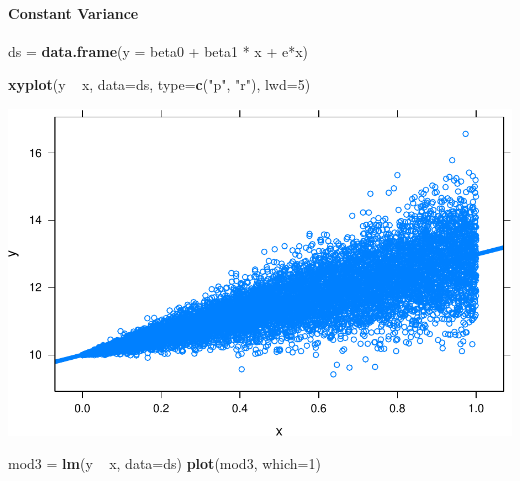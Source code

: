 \documentclass[]{article}
\newenvironment{Shaded}{\begin{snugshade}}{\end{snugshade}}
\newcommand{\KeywordTok}[1]{\textcolor[rgb]{0.13,0.29,0.53}{\textbf{{#1}}}}
\newcommand{\DataTypeTok}[1]{\textcolor[rgb]{0.13,0.29,0.53}{{#1}}}
\newcommand{\DecValTok}[1]{\textcolor[rgb]{0.00,0.00,0.81}{{#1}}}
\newcommand{\StringTok}[1]{\textcolor[rgb]{0.31,0.60,0.02}{{#1}}}
\newcommand{\NormalTok}[1]{{#1}}
\let\oldparagraph\paragraph
\renewcommand{\paragraph}[1]{\oldparagraph{#1}\mbox{}}
\begin{document}
\paragraph{Constant Variance}\label{constant-variance}

\begin{Shaded}
\begin{Highlighting}[]
\NormalTok{ds =}\StringTok{ }\KeywordTok{data.frame}\NormalTok{(}\DataTypeTok{y =} \NormalTok{beta0 +}\StringTok{ }\NormalTok{beta1 *}\StringTok{ }\NormalTok{x +}\StringTok{ }\NormalTok{e*x)}
\end{Highlighting}
\end{Shaded}

\begin{Shaded}
\begin{Highlighting}[]
\KeywordTok{xyplot}\NormalTok{(y ~}\StringTok{ }\NormalTok{x, }\DataTypeTok{data=}\NormalTok{ds, }\DataTypeTok{type=}\KeywordTok{c}\NormalTok{(}\StringTok{"p"}\NormalTok{, }\StringTok{"r"}\NormalTok{), }\DataTypeTok{lwd=}\DecValTok{5}\NormalTok{)}
\end{Highlighting}
\end{Shaded}

\includegraphics{02_lab_residuals_files/figure-latex/unnamed-chunk-15-1.pdf}

\begin{Shaded}
\begin{Highlighting}[]
\NormalTok{mod3 =}\StringTok{ }\KeywordTok{lm}\NormalTok{(y ~}\StringTok{ }\NormalTok{x, }\DataTypeTok{data=}\NormalTok{ds)}
\KeywordTok{plot}\NormalTok{(mod3, }\DataTypeTok{which=}\DecValTok{1}\NormalTok{)}
\end{Highlighting}
\end{Shaded}
\end{document}
